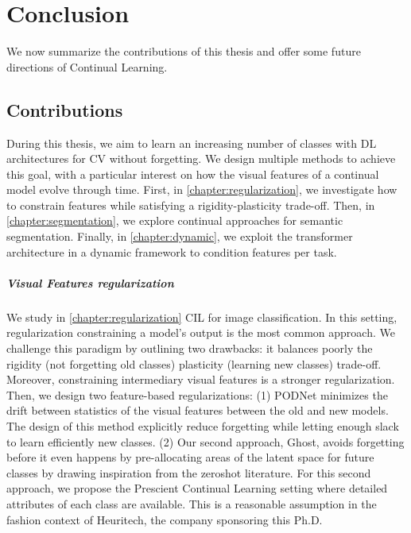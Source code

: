 \chapter{Conclusion}
\label{chapter:conclusion}

{}


We now summarize the contributions of this thesis and offer some future directions of Continual
Learning.

\section{Contributions}

During this thesis, we aim to learn an increasing number of classes with \ac{DL} architectures for
\ac{CV} without forgetting. We design multiple methods to achieve this goal, with a particular
interest on how the visual features of a continual model evolve through time. First, in
\autoref{chapter:regularization}, we investigate how to constrain features while satisfying a
rigidity-plasticity trade-off. Then, in \autoref{chapter:segmentation}, we explore continual
approaches for semantic segmentation. Finally, in \autoref{chapter:dynamic}, we exploit the
transformer architecture in a dynamic framework to condition features per task.

\paragraph{Visual Features regularization} We study in \autoref{chapter:regularization} \ac{CIL} for
image classification. In this setting, regularization constraining a model's output is the most
common approach. We challenge this paradigm by outlining two drawbacks: it balances poorly the
rigidity (not forgetting old classes) \vs plasticity (learning new classes) trade-off. Moreover,
constraining intermediary visual features is a stronger regularization. Then, we design two
feature-based regularizations: (1) PODNet minimizes the drift between statistics of the visual
features between the old and new models. The design of this method explicitly reduce forgetting
while letting enough slack to learn efficiently new classes. (2) Our second approach, Ghost, avoids
forgetting before it even happens by pre-allocating areas of the latent space for future classes by
drawing inspiration from the zeroshot literature. For this second approach, we propose the Prescient
Continual Learning setting where detailed attributes of each class are available. This is a
reasonable assumption in the fashion context of Heuritech, the company sponsoring this Ph.D.

